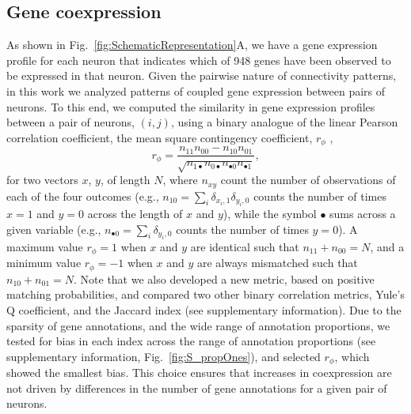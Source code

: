 \documentclass[10pt,letterpaper]{article}
\begin{document}
\subsection*{Gene coexpression}
As shown in Fig.~\ref{fig:SchematicRepresentation}A, we have a gene expression profile for each neuron that indicates which of 948 genes have been observed to be expressed in that neuron.
Given the pairwise nature of connectivity patterns, in this work we analyzed patterns of coupled gene expression between pairs of neurons.
To this end, we computed the similarity in gene expression profiles between a pair of neurons, $(i,j)$, using a binary analogue of the linear Pearson correlation coefficient, the mean square contingency coefficient, $r_\phi$ \cite{Warrens2008},
\begin{equation}
    r_\phi = \frac{n_{11}n_{00} - n_{10}n_{01}}{\sqrt{n_{1\bullet}n_{0\bullet}n_{\bullet 0}n_{\bullet 1}}},
\end{equation}
for two vectors $x$, $y$, of length $N$, where $n_{xy}$ count the number of observations of each of the four outcomes (e.g., $n_{10} = \sum_i \delta_{x_i,1}\delta_{y_i,0}$ counts the number of times $x=1$ and $y=0$ across the length of $x$ and $y$), while the symbol $\bullet$ sums across a given variable (e.g., $n_{\bullet 0} = \sum_i \delta_{y_i,0}$ counts the number of times $y = 0$).
A maximum value $r_\phi = 1$ when $x$ and $y$ are identical such that $n_{11} + n_{00} = N$, and a minimum value $r_\phi = -1$ when $x$ and $y$ are always mismatched such that $n_{10} + n_{01} = N$.
Note that we also developed a new metric, based on positive matching probabilities, and compared two other binary correlation metrics, Yule's Q coefficient, and the Jaccard index (see supplementary information).
Due to the sparsity of gene annotations, and the wide range of annotation proportions, we tested for bias in each index across the range of annotation proportions (see supplementary information, Fig.~\ref{fig:S_propOnes}), and selected $r_\phi$, which showed the smallest bias.
This choice ensures that increases in coexpression are not driven by differences in the number of gene annotations for a given pair of neurons.
\end{document}
